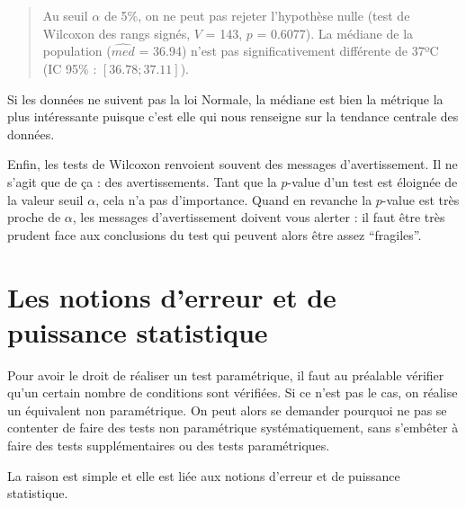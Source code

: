 \documentclass[
  french,
  a4paper,
  DIV=11,
  numbers=noendperiod,
  oneside]{scrreprt}
\begin{document}
\begin{quote}
Au seuil \(\alpha\) de 5\%, on ne peut pas rejeter l'hypothèse nulle
(test de Wilcoxon des rangs signés, \(V\) = 143, \(p\) = 0.6077). La
médiane de la population (\(\widehat{med}\) = 36.94) n'est pas
significativement différente de 37ºC (IC 95\% : \([36.78 ; 37.11]\)).
\end{quote}

Si les données ne suivent pas la loi Normale, la médiane est bien la
métrique la plus intéressante puisque c'est elle qui nous renseigne sur
la tendance centrale des données.

Enfin, les tests de Wilcoxon renvoient souvent des messages
d'avertissement. Il ne s'agit que de ça : des avertissements. Tant que
la \(p\)-value d'un test est éloignée de la valeur seuil \(\alpha\),
cela n'a pas d'importance. Quand en revanche la \(p\)-value est très
proche de \(\alpha\), les messages d'avertissement doivent vous alerter
: il faut être très prudent face aux conclusions du test qui peuvent
alors être assez ``fragiles''.

\section{Les notions d'erreur et de puissance
statistique}\label{sec-puiss}

Pour avoir le droit de réaliser un test paramétrique, il faut au
préalable vérifier qu'un certain nombre de conditions sont vérifiées. Si
ce n'est pas le cas, on réalise un équivalent non paramétrique. On peut
alors se demander pourquoi ne pas se contenter de faire des tests non
paramétrique systématiquement, sans s'embêter à faire des tests
supplémentaires ou des tests paramétriques.

La raison est simple et elle est liée aux notions d'erreur et de
puissance statistique.
\end{document}
